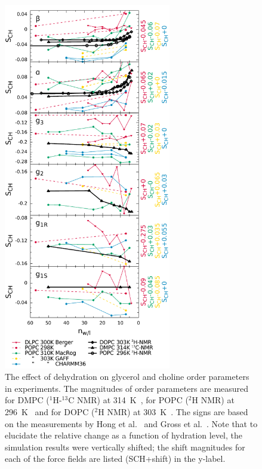 \documentclass[journal=jpcbfk,manuscript=article]{achemso}
\begin{document}
\begin{figure}[]
  \centering
  \includegraphics[width=7.3cm]{../DATAreportediINblog/dehydration.pdf}
    \caption{\label{ordPhydr}
    The effect of dehydration on glycerol and choline order parameters in experiments.
    The magnitudes of order parameters are measured for DMPC ($^1$H-$^{13}$C NMR) at 314~K~\cite{dvinskikh05b}, 
    for POPC ($^2$H NMR) at 296~K~\cite{bechinger91} and for DOPC ($^2$H NMR) at 303~K~\cite{ulrich94}. 
    The signs are based on the measurements by Hong et al.~\cite{hong95a,hong95b} 
    and Gross et al.~\cite{gross97}.
    Note that to elucidate the relative change as a function of hydration level, the simulation results were vertically shifted; 
    the shift magnitudes for each of the force fields are listed (SCH+shift) in the y-label.
  }
\end{figure}
\end{document}
